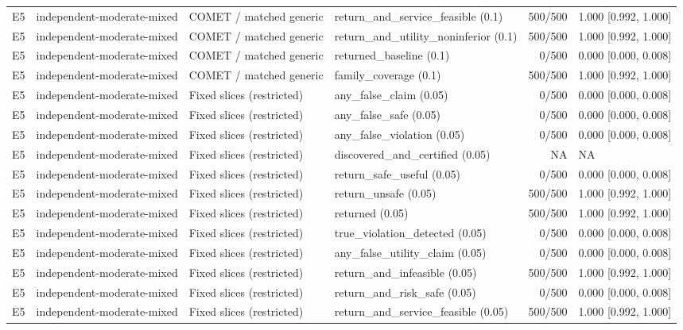 \begin{longtable}{p{.04\linewidth}p{.18\linewidth}p{.19\linewidth}p{.16\linewidth}r p{.21\linewidth}}
E5 & independent-moderate-mixed & COMET / matched generic & return\_and\_service\_feasible (0.1) & 500/500 & 1.000 [0.992, 1.000]\\
E5 & independent-moderate-mixed & COMET / matched generic & return\_and\_utility\_noninferior (0.1) & 500/500 & 1.000 [0.992, 1.000]\\
E5 & independent-moderate-mixed & COMET / matched generic & returned\_baseline (0.1) & 0/500 & 0.000 [0.000, 0.008]\\
E5 & independent-moderate-mixed & COMET / matched generic & family\_coverage (0.1) & 500/500 & 1.000 [0.992, 1.000]\\
E5 & independent-moderate-mixed & Fixed slices (restricted) & any\_false\_claim (0.05) & 0/500 & 0.000 [0.000, 0.008]\\
E5 & independent-moderate-mixed & Fixed slices (restricted) & any\_false\_safe (0.05) & 0/500 & 0.000 [0.000, 0.008]\\
E5 & independent-moderate-mixed & Fixed slices (restricted) & any\_false\_violation (0.05) & 0/500 & 0.000 [0.000, 0.008]\\
E5 & independent-moderate-mixed & Fixed slices (restricted) & discovered\_and\_certified (0.05) & NA & NA\\
E5 & independent-moderate-mixed & Fixed slices (restricted) & return\_safe\_useful (0.05) & 0/500 & 0.000 [0.000, 0.008]\\
E5 & independent-moderate-mixed & Fixed slices (restricted) & return\_unsafe (0.05) & 500/500 & 1.000 [0.992, 1.000]\\
E5 & independent-moderate-mixed & Fixed slices (restricted) & returned (0.05) & 500/500 & 1.000 [0.992, 1.000]\\
E5 & independent-moderate-mixed & Fixed slices (restricted) & true\_violation\_detected (0.05) & 0/500 & 0.000 [0.000, 0.008]\\
E5 & independent-moderate-mixed & Fixed slices (restricted) & any\_false\_utility\_claim (0.05) & 0/500 & 0.000 [0.000, 0.008]\\
E5 & independent-moderate-mixed & Fixed slices (restricted) & return\_and\_infeasible (0.05) & 500/500 & 1.000 [0.992, 1.000]\\
E5 & independent-moderate-mixed & Fixed slices (restricted) & return\_and\_risk\_safe (0.05) & 0/500 & 0.000 [0.000, 0.008]\\
E5 & independent-moderate-mixed & Fixed slices (restricted) & return\_and\_service\_feasible (0.05) & 500/500 & 1.000 [0.992, 1.000]\\

\end{longtable}
